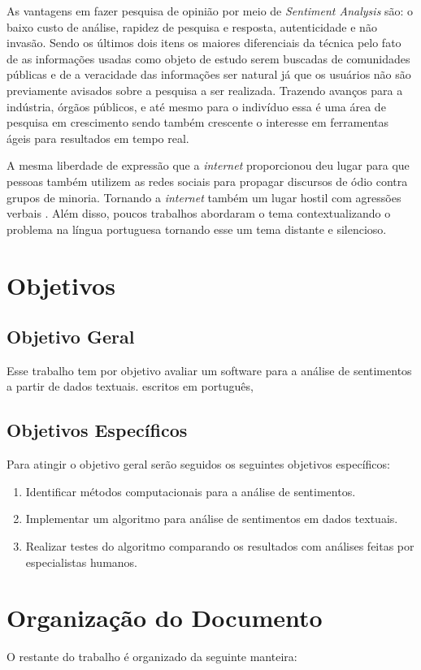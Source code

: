 As vantagens em fazer pesquisa de opinião por meio de \textit{Sentiment Analysis} são: o baixo custo de análise, rapidez de pesquisa e resposta, autenticidade e não invasão. Sendo os últimos dois itens os maiores diferenciais da técnica pelo fato de as informações usadas como objeto de estudo serem buscadas de comunidades públicas e de a veracidade das informações ser natural já que os usuários não são previamente avisados sobre a pesquisa a ser realizada. Trazendo avanços para a indústria, órgãos públicos, e até mesmo para o indivíduo essa é uma área de pesquisa em crescimento sendo também crescente o interesse em ferramentas ágeis para resultados em tempo real. 

A mesma liberdade de expressão que a \textit{internet} proporcionou deu lugar para que pessoas também utilizem as redes sociais para propagar discursos de ódio contra grupos de minoria. Tornando a \textit{internet} também um lugar hostil com agressões verbais \cite{Chetty2018}.  Além disso, poucos trabalhos abordaram o tema contextualizando o problema na língua portuguesa tornando esse um tema distante e silencioso.

\section{Objetivos}
\subsection{Objetivo Geral}    
    Esse trabalho tem por objetivo avaliar um software para a análise de sentimentos a partir de dados textuais. escritos em português, 

\subsection{Objetivos Específicos}
    Para atingir o objetivo geral serão seguidos os seguintes objetivos específicos:
\begin{enumerate}
    \item Identificar métodos computacionais para a análise de sentimentos.
    \item Implementar um algoritmo para análise de sentimentos em dados textuais.
    \item Realizar testes do algoritmo comparando os resultados com análises feitas por especialistas humanos.
\end{enumerate}
	
\section{Organização do Documento}
O restante do trabalho é organizado da seguinte manteira:

